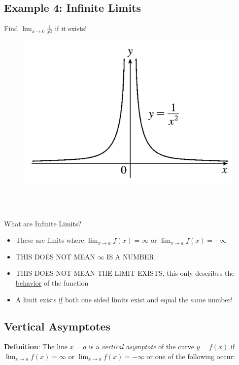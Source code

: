 \documentclass[10pt]{book}
\theoremstyle{definition}
\begin{document}
\subsection*{Example 4: Infinite Limits} Find $\displaystyle\lim_{x\rightarrow 0}\frac{1}{x^2}$ if it exists!
\begin{figure}[h!]
    \centering
    \includegraphics[scale=0.3]{fig4.png}
\end{figure}
\\ \\
\begin{tcolorbox}{What are Infinite Limits?}
\begin{itemize}
    \item These are limits where $\displaystyle\lim_{x\rightarrow a}f(x)= \infty$ or $\displaystyle\lim_{x\rightarrow a}f(x)= -\infty$
    \item THIS DOES NOT MEAN $\infty$ IS A NUMBER
    \item THIS DOES NOT MEAN THE LIMIT EXISTS, this only describes the \underline{behavior} of the function
    \item A limit exists \underline{if} both one sided limits exist and equal the same number!
\end{itemize}
\end{tcolorbox}
\subsection*{Vertical Asymptotes}
\textbf{Definition}: The line $x=a$ is a \textit{vertical asymptote} of the curve $y=f(x)$ if $\displaystyle\lim_{x\rightarrow a}f(x)=\infty$ or $\displaystyle\lim_{x\rightarrow a}f(x)=-\infty$ or one of the following occur:
\end{document}
